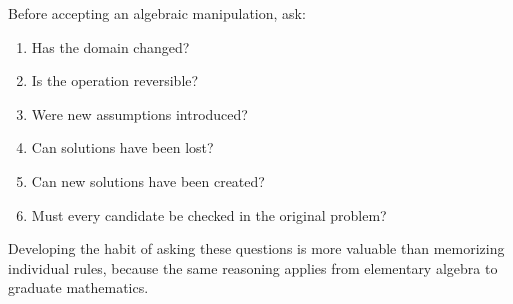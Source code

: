 \documentclass{essay}
\begin{document}
Before accepting an algebraic manipulation, ask:

\begin{enumerate}
\item Has the domain changed?
\item Is the operation reversible?
\item Were new assumptions introduced?
\item Can solutions have been lost?
\item Can new solutions have been created?
\item Must every candidate be checked in the original problem?
\end{enumerate}

Developing the habit of asking these questions is more valuable than memorizing
individual rules, because the same reasoning applies from elementary algebra to
graduate mathematics.
\end{document}
